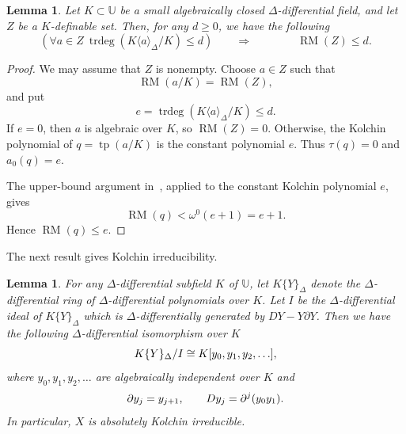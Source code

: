 \documentclass[11pt,a4paper]{amsart}
\newtheorem{lemma}[theorem]{Lemma}
\theoremstyle{definition}
\newcommand{\RM}{\operatorname{RM}}
\newcommand{\tp}{\operatorname{tp}}
\newcommand{\trdeg}{\operatorname{trdeg}}
\newcommand{\Uu}{{\mathds{U}}}
\begin{document}
\begin{lemma}\label{finite-dimensional-bound}
Let $K\subset \Uu$ be a small algebraically closed $\Delta$-differential field,
and let $Z$ be a $K$-definable set. Then, for any $d\geqslant0$, we have the following
\[
\left(\forall a\in Z \ \trdeg(K\langle a\rangle_\Delta/K)\leqslant d\right)\qquad \Longrightarrow\qquad
\qquad \RM(Z)\leqslant d.
\]
\end{lemma}
\begin{proof}
We may assume that $Z$ is nonempty. Choose $a\in Z$
such that
\[
\RM(a/K)=\RM(Z),
\]
and put
\[
e=\trdeg(K\langle a\rangle_\Delta/K)\leqslant d.
\]
If $e=0$, then $a$ is algebraic over $K$, so
$\RM(Z)=0$. Otherwise, the Kolchin polynomial of
$q=\tp(a/K)$ is the constant polynomial $e$.
Thus $\tau(q)=0$ and $a_0(q)=e$.

The upper-bound argument in~\cite[Lemma~5.2.6 and
Proposition~4.2.9]{McGrail}, applied to the constant
Kolchin polynomial $e$, gives
\[
\RM(q)<\omega^0(e+1)=e+1.
\]
Hence $\RM(q)\leqslant e$.
\end{proof}
The next result gives Kolchin irreducibility.
\begin{lemma}\label{irred}
For any $\Delta$-differential subfield $K$ of $\Uu$, let $K\{Y\}_{\Delta}$ denote the $\Delta$-differential ring of $\Delta$-differential polynomials over $K$. Let $I$ be the $\Delta$-differential ideal of $K\{Y\}_{\Delta}$ which is $\Delta$-differentially generated by $DY-Y\partial Y$. Then we have the following $\Delta$-differential isomorphism over $K$
\begin{equation}\label{coordinate-ring}
 K\{Y\}_\Delta/I
 \cong K[y_0,y_1,y_2,\ldots],
 \notag
\end{equation}
where $y_0,y_1,y_2,\ldots$ are algebraically independent over $K$ and
\begin{equation}\label{jet-actions}
 \partial y_j=y_{j+1},\qquad
 Dy_j=\partial^j(y_0y_1).
\notag
\end{equation}
In particular, $X$ is absolutely Kolchin irreducible.
\end{lemma}
\end{document}
